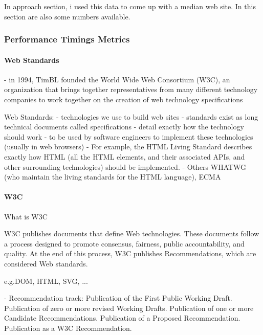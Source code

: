 In approach section, i used this data to come up with a median web site.
In this section are also some numbers available.




\subsubsection{Performance Timings Metrics}


\paragraph{Web Standards}

- in 1994, TimBL founded the World Wide Web Consortium (W3C), an organization that brings together representatives from many different technology companies to work together on the creation of web technology specifications

Web Standards:
- technologies we use to build web sites
- standards exist as long technical documents called specifications
- detail exactly how the technology should work
-  to be used by software engineers to implement these technologies (usually in web browsers)
- For example, the HTML Living Standard describes exactly how HTML (all the HTML elements, and their associated APIs, and other surrounding technologies) should be implemented.
- Others  WHATWG (who maintain the living standards for the HTML language), ECMA



\paragraph{W3C}


What is W3C

W3C publishes documents that define Web technologies. These documents follow a process designed to promote consensus, fairness, public accountability, and quality. At the end of this process, W3C publishes Recommendations, which are considered Web standards.

e.g.DOM,  HTML, SVG, ...




- Recommendation track:
Publication of the First Public Working Draft.
Publication of zero or more revised Working Drafts.
Publication of one or more Candidate Recommendations.
Publication of a Proposed Recommendation.
Publication as a W3C Recommendation.

